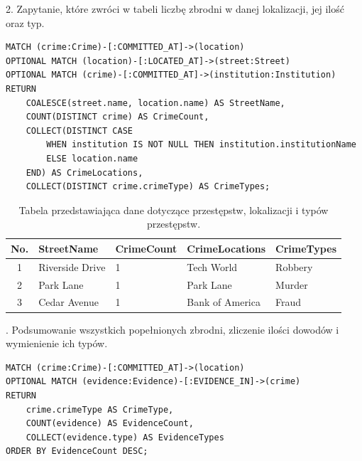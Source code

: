 \documentclass[a4paper,12pt]{article}
\begin{document}
2. Zapytanie, które zwróci w tabeli liczbę zbrodni w danej lokalizacji, jej ilość oraz typ.

\begin{center}
\begin{minipage}{0.8\linewidth}
\begin{lstlisting}[language=Cypher, basicstyle=\small, breaklines=true]
MATCH (crime:Crime)-[:COMMITTED_AT]->(location)
OPTIONAL MATCH (location)-[:LOCATED_AT]->(street:Street)
OPTIONAL MATCH (crime)-[:COMMITTED_AT]->(institution:Institution)
RETURN 
    COALESCE(street.name, location.name) AS StreetName, 
    COUNT(DISTINCT crime) AS CrimeCount, 
    COLLECT(DISTINCT CASE 
        WHEN institution IS NOT NULL THEN institution.institutionName 
        ELSE location.name 
    END) AS CrimeLocations,
    COLLECT(DISTINCT crime.crimeType) AS CrimeTypes;
\end{lstlisting}
\end{minipage}
\end{center}

\begin{table}[h!]
\centering
\begin{tabular}{|c|l|l|l|l|}
\hline
\textbf{No.} & \textbf{StreetName}     & \textbf{CrimeCount} & \textbf{CrimeLocations}     & \textbf{CrimeTypes} \\ \hline
1            & Riverside Drive         & 1                   &Tech World              & Robbery         \\ \hline
2            & Park Lane               & 1                   &Park Lane               & Murder          \\ \hline
3            & Cedar Avenue            & 1                   &Bank of America         & Fraud           \\ \hline
\end{tabular}
\caption{Tabela przedstawiająca dane dotyczące przestępstw, lokalizacji i typów przestępstw.}
\label{tab:crime_data}
\end{table}

. Podsumowanie wszystkich popełnionych zbrodni, zliczenie ilości dowodów i wymienienie ich typów.

\begin{center}
\begin{minipage}{0.8\linewidth}
\begin{lstlisting}[language=Cypher, basicstyle=\small, breaklines=true]
MATCH (crime:Crime)-[:COMMITTED_AT]->(location)
OPTIONAL MATCH (evidence:Evidence)-[:EVIDENCE_IN]->(crime)
RETURN 
    crime.crimeType AS CrimeType,
    COUNT(evidence) AS EvidenceCount,
    COLLECT(evidence.type) AS EvidenceTypes
ORDER BY EvidenceCount DESC;
\end{lstlisting}
\end{minipage}
\end{center}
\end{document}
